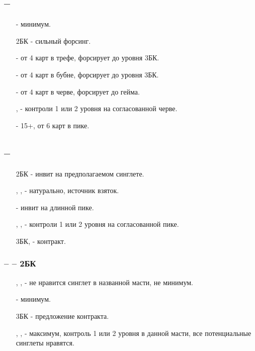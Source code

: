 \documentclass{article}
\begin{document}
\subsection{ -- }
\begin{enumerate} 
    \item[\sp{2}] - минимум.
    \item[2БК] - сильный форсинг.
    \item[\cl{3}] - от 4 карт в трефе, форсирует до уровня 3БК.
    \item[\di{3}] - от 4 карт в бубне, форсирует до уровня 3БК.
    \item[\he{3}] - от 4 карт в черве, форсирует до гейма.
    \item[\cl{4}, \di{4}] - контроли 1 или 2 уровня на согласованной черве.
    \item[\sp{3}] - 15+, от 6 карт в пике.
\end{enumerate}
\subsection{ -- }
\begin{enumerate} 
    \item[2БК] - инвит на предполагаемом синглете.
    \item[\cl{3}, \di{3}, \he{3}] - натурально, источник взяток.
    \item[\sp{3}] - инвит на длинной пике.
    \item[\cl{4}, \di{4}, \he{4}] - контроли 1 или 2 уровня на согласованной пике.
    \item[3БК, \sp{4}] - контракт.
\end{enumerate}
\subsubsection{ --  -- 2БК}
\begin{enumerate}
    \item[\cl{3}, \di{3}, \he{3}] -  не нравится синглет в названной масти, не минимум.
    \item[\sp{3}] - минимум.
    \item[3БК] - предложение контракта.
    \item[\cl{4}, \di{4}, \he{4}] - максимум, контроль 1 или 2 уровня в данной масти, все потенциальные синглеты нравятся.
\end{enumerate}
\end{document}
